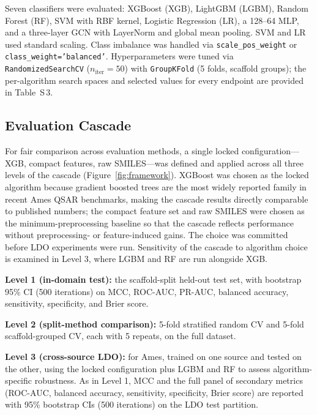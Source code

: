 Seven classifiers were evaluated: XGBoost (XGB),\cite{Chen_XGBoost_2016} LightGBM 
(LGBM),\cite{Ke_LightGBM_2017} Random Forest (RF),\cite{Breiman_2001} SVM with RBF 
kernel,\cite{Cortes_Vapnik_1995} Logistic Regression (LR),\cite{Cox_1958} a 128--64 
MLP,\cite{Rumelhart_1986} and a three-layer GCN\cite{Kipf_Welling_2017} with LayerNorm and 
global mean pooling. SVM and LR used standard scaling. Class imbalance was handled via 
\texttt{scale\_pos\_weight} or \texttt{class\_weight='balanced'}. Hyperparameters were tuned 
via \texttt{RandomizedSearchCV} ($n_{\mathrm{iter}}=50$) with 
\texttt{GroupKFold}\cite{Pedregosa_sklearn_2011} (5 folds, scaffold groups); the per-algorithm 
search spaces and selected values for every endpoint are provided in 
Table~S\,3.

\subsection{Evaluation Cascade}

For fair comparison across evaluation methods, a single locked configuration---XGB, compact 
features, raw SMILES---was defined and applied across all three levels of the cascade 
(Figure~\ref{fig:framework}). XGBoost was chosen as the locked algorithm because gradient 
boosted trees are the most widely reported family in recent Ames QSAR 
benchmarks,\cite{Honma_2019,Furuhama_2023,Li_2021} making the cascade results directly 
comparable to published numbers; the compact feature set and raw SMILES were chosen as the 
minimum-preprocessing baseline so that the cascade reflects performance without 
preprocessing- or feature-induced gains. The choice was committed before LDO experiments 
were run. Sensitivity of the cascade to algorithm choice is examined in Level 3, where LGBM 
and RF are run alongside XGB.

\textbf{Level 1 (in-domain test):} the scaffold-split held-out test set, with bootstrap 
95\% CI (500 iterations) on MCC,\cite{Matthews_1975} ROC-AUC, PR-AUC, balanced accuracy, 
sensitivity, specificity, and Brier score.\cite{Brier_1950}

\textbf{Level 2 (split-method comparison):} 5-fold stratified random CV and 5-fold 
scaffold-grouped CV, each with 5 repeats, on the full dataset.

\textbf{Level 3 (cross-source LDO):} for Ames, trained on one source and tested on the 
other, using the locked configuration plus LGBM and RF to assess algorithm-specific 
robustness. As in Level 1, MCC and the full panel of secondary metrics (ROC-AUC, balanced 
accuracy, sensitivity, specificity, Brier score) are reported with 95\% bootstrap CIs (500 
iterations) on the LDO test partition.

